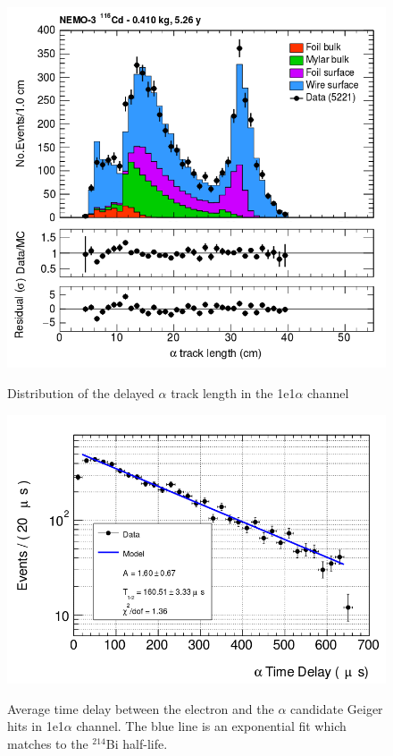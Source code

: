 \documentclass[main.tex]{subfiles}
\begin{document}
\begin{figure}[h!]
\centering
\includegraphics[scale=0.35]{pictures/Chap6/Bkg1e1aAlphaLength.png}
\label{1e1aChannel_alpphaLength}
\caption{Distribution of the delayed $\alpha$ track length in the 1e1$\alpha$ channel }
\end{figure}


\begin{figure}[h!]
\centering
\includegraphics[scale=0.35]{pictures/Chap6/alphaTimeDelay1e1aChannel.png}
\label{1e1aChannel_alphaDelayTime}
\caption{Average time delay between the electron and the $\alpha$ candidate Geiger hits in 1e1$\alpha$ channel. The blue line is an exponential fit which matches to the $^{\text{214}}$Bi half-life.}
\end{figure}
\end{document}
